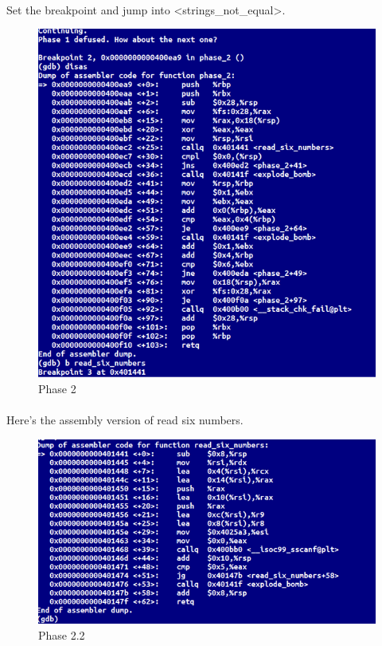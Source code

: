 \documentclass[a4paper]{article}
\begin{document}
\paragraph{}
Set the breakpoint and jump into  \textless strings\_not\_equal\textgreater.
\newpage
\begin{figure}[h!]
  \includegraphics[width=\linewidth]{bai2_1.png}
  \caption{Phase 2}
  \label{}
\end{figure}

\paragraph{}
Here’s the assembly version of read six numbers.  
\newpage
\begin{figure}[h!]
  \includegraphics[width=\linewidth]{bai2_2.png}
  \caption{Phase 2.2}
  \label{}
\end{figure}
\end{document}
